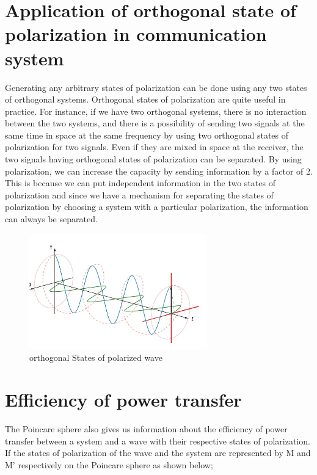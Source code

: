 \section{Application of orthogonal state of polarization in communication system}	
Generating any arbitrary states of polarization can be done using any two states of orthogonal systems. Orthogonal states of polarization are quite useful in practice. For instance, if we have two orthogonal systems, there is no interaction between the two systems, and there is a possibility of sending two signals at the same time in space at the same frequency by using two orthogonal states of polarization for two signals. Even if they are mixed in space at the receiver, the two signals having orthogonal states of polarization can be separated. By using polarization, we can increase the capacity by sending information by a factor of 2. This is because we can put independent information in the two states of polarization and since we have a mechanism for separating the states of polarization by choosing a system with a particular polarization, the information can always be separated.	
\begin{figure}[h]
\centering
\includegraphics[height=5cm]{"./graphics/orthogonal polarized wave"}
\caption{orthogonal States of polarized wave}
\label{fig:orthogonal-polarized-wave}
\end{figure}


\section{Efficiency of power transfer}
The Poincare sphere also gives us information about the efficiency of power transfer between a system and a wave with their respective states of polarization. If the states of polarization of the wave and the system are represented by M and M' respectively on the Poincare sphere as shown below;

